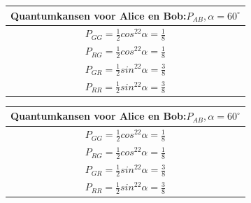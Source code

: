 \documentclass[../../main.tex]{subfiles}
\begin{document}
\begingroup%
\renewcommand{\arraystretch}{1.5} %
\begin{tabular}{|c|}
\hline
Quantumkansen voor Alice en Bob:$P_{AB}, \alpha=60^{\circ}$\\ \hline
$P_{GG}=\tfrac{1}{2}cos^22\alpha = \tfrac{1}{8}$\\ 
$P_{RG}=\tfrac{1}{2}cos^22\alpha = \tfrac{1}{8}$\\ 
$P_{GR}=\tfrac{1}{2}sin^22\alpha = \tfrac{3}{8}$\\ 
$P_{RR}=\tfrac{1}{2}sin^22\alpha = \tfrac{3}{8}$\\ \hline
\end{tabular}
\endgroup

\begingroup%
\renewcommand{\arraystretch}{1.5} %
\begin{tabular}{|c|}
\hline
Quantumkansen voor Alice en Bob:$P_{AB}, \alpha=60^{\circ}$\\ \hline
$P_{GG}=\tfrac{1}{2}cos^22\alpha = \tfrac{1}{8}$\\ 
$P_{RG}=\tfrac{1}{2}cos^22\alpha = \tfrac{1}{8}$\\ 
$P_{GR}=\tfrac{1}{2}sin^22\alpha = \tfrac{3}{8}$\\ 
$P_{RR}=\tfrac{1}{2}sin^22\alpha = \tfrac{3}{8}$\\ \hline
\end{tabular}
\endgroup
 %
\end{document}
